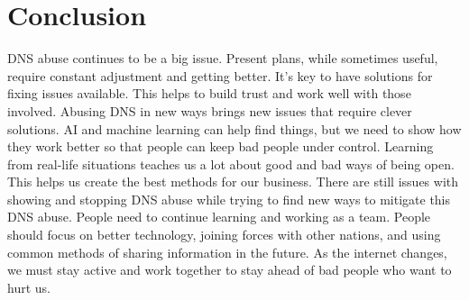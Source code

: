 \section{Conclusion}

DNS abuse continues to be a big issue. Present plans, while sometimes useful, require constant adjustment and getting better. It's key to have solutions for fixing issues available. This helps to build trust and work well with those involved. Abusing DNS in new ways brings new issues that require clever solutions. AI and machine learning can help find things, but we need to show how they work better so that people can keep bad people under control. Learning from real-life situations teaches us a lot about good and bad ways of being open. This helps us create the best methods for our business. There are still issues with showing and stopping DNS abuse while trying to find new ways to mitigate this DNS abuse. People need to continue learning and working as a team. People should focus on better technology, joining forces with other nations, and using common methods of sharing information in the future. As the internet changes, we must stay active and work together to stay ahead of bad people who want to hurt us. 




















